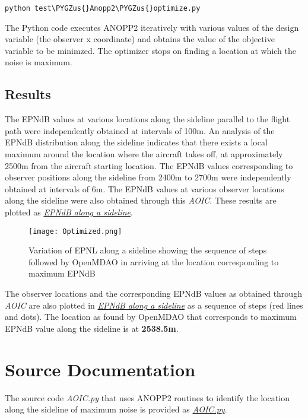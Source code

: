 \documentclass[letterpaper,10pt,english]{sphinxmanual}
\def\PYGZus{\char`\_}
\begin{document}
\begin{Verbatim}[commandchars=\\\{\}]
python test\PYGZus{}Anopp2\PYGZus{}optimize.py
\end{Verbatim}

The Python code executes ANOPP2 iteratively with various values of the design variable (the observer x coordinate) and obtains the value of the objective variable to be minimzed.
The optimizer stops on finding a location at which the noise is maximum.


\section{Results}
\label{usage:results}
The EPNdB values at various locations along the sideline parallel to the flight path were independently obtained at intervals of 100m.
An analysis of the EPNdB distribution along the sideline indicates that there exists a local maximum around the location where the aircraft takes off, at approximately 2500m from the aircraft starting location.
The EPNdB values corresponding to observer positions along the sideline from 2400m to 2700m were independently obtained at intervals of 6m.
The EPNdB values at various observer locations along the sideline were also obtained through this \emph{AOIC}.
These results are plotted as {\hyperref[usage:epndb-along-a-sideline]{\emph{EPNdB along a sideline}}}.
\begin{figure}[htbp]
\centering
\capstart

\texttt{[image: Optimized.png]}
\caption{Variation of EPNL along a sideline showing the sequence of steps followed by OpenMDAO in arriving at the location corresponding to maximum EPNdB}\label{usage:epndb-along-a-sideline}\end{figure}

The observer locations and the corresponding EPNdB values as obtained through \emph{AOIC} are also plotted in {\hyperref[usage:epndb-along-a-sideline]{\emph{EPNdB along a sideline}}} as a sequence of steps (red lines and dots).
The location as found by OpenMDAO that corresponds to maximum EPNdB value along the sideline is at \textbf{2538.5m}.


\chapter{Source Documentation}
\label{srcdocs:anopp2-src-label}\label{srcdocs::doc}\label{srcdocs:source-documentation}
The source code \emph{AOIC.py} that uses ANOPP2 routines to identify the location along the sideline of maximum noise is provided as {\hyperref[srcdocs:aoic-py]{\emph{AOIC.py}}}.
\end{document}
